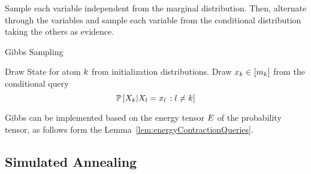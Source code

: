 Sample each variable independent from the marginal distribution.
Then, alternate through the variables and sample each variable from the conditional distribution taking the others as evidence.

\begin{algorithm}[hbt!]
\caption{Gibbs Sampling}\label{alg:Gibbs}
\begin{algorithmic}
\For{$\catenumeratorin$}
	\State Draw State for atom $k$ from initialization distributions. %
\EndFor
{}
\For{$\catenumeratorin$}
	\State Draw $x_{k}\in[m_{k}]$ from the conditional query
		\[ \mathbb{P}\left[X_{k}|X_{l}=x_{l}\, : l \neq k\right] \]
\EndFor
\EndWhile
\end{algorithmic}
\end{algorithm}



Gibbs can be implemented based on the energy tensor $E$ of the probability tensor, as follows form the Lemma~\ref{lem:energyContractionQueries}.



	






\subsection{Simulated Annealing}


